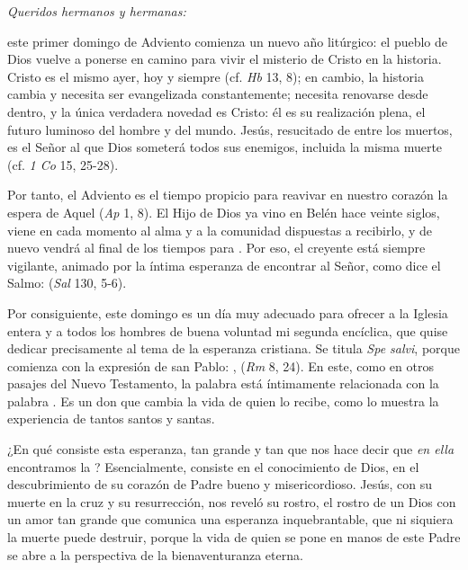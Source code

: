 \begin{body} 
	\emph{Queridos hermanos y hermanas:} 
	
	 este primer domingo de Adviento comienza un nuevo año litúrgico: el pueblo de Dios vuelve a ponerse en camino para vivir el misterio de Cristo en la historia. Cristo es el mismo ayer, hoy y siempre (cf. \emph{Hb} 13, 8); en cambio, la historia cambia y necesita ser evangelizada constantemente; necesita renovarse desde dentro, y la única verdadera novedad es Cristo: él es su realización plena, el futuro luminoso del hombre y del mundo. Jesús, resucitado de entre los muertos, es el Señor al que Dios someterá todos sus enemigos, incluida la misma muerte (cf. \emph{1 Co} 15, 25-28). 
	
	Por tanto, el Adviento es el tiempo propicio para reavivar en nuestro corazón la espera de Aquel  (\emph{Ap} 1, 8). El Hijo de Dios ya vino en Belén hace veinte siglos, viene en cada momento al alma y a la comunidad dispuestas a recibirlo, y de nuevo vendrá al final de los tiempos para . Por eso, el creyente está siempre vigilante, animado por la íntima esperanza de encontrar al Señor, como dice el Salmo:  (\emph{Sal} 130, 5-6). 
	
	Por consiguiente, este domingo es un día muy adecuado para ofrecer a la Iglesia entera y a todos los hombres de buena voluntad mi segunda encíclica, que quise dedicar precisamente al tema de la esperanza cristiana. Se titula \emph{Spe salvi}, porque comienza con la expresión de san Pablo: \emph{},  (\emph{Rm} 8, 24). En este, como en otros pasajes del Nuevo Testamento, la palabra  está íntimamente relacionada con la palabra . Es un don que cambia la vida de quien lo recibe, como lo muestra la experiencia de tantos santos y santas. 
	
	¿En qué consiste esta esperanza, tan grande y tan  que nos hace decir que \emph{en ella} encontramos la ? Esencialmente, consiste en el conocimiento de Dios, en el descubrimiento de su corazón de Padre bueno y misericordioso. Jesús, con su muerte en la cruz y su resurrección, nos reveló su rostro, el rostro de un Dios con un amor tan grande que comunica una esperanza inquebrantable, que ni siquiera la muerte puede destruir, porque la vida de quien se pone en manos de este Padre se abre a la perspectiva de la bienaventuranza eterna. 
	

\end{body}

